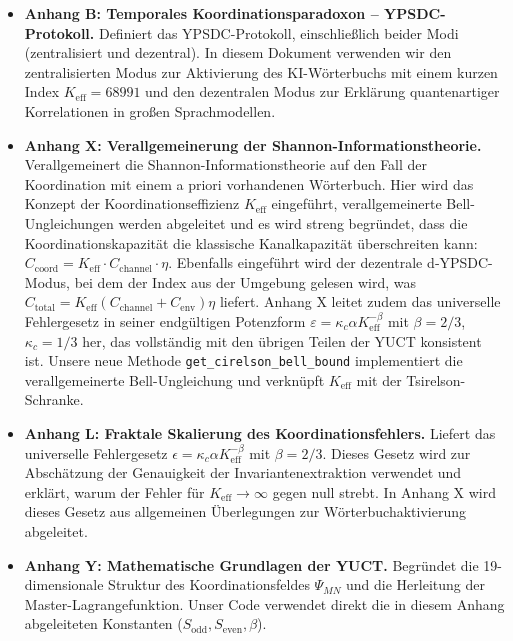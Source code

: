 \documentclass[12pt,a4paper]{article}
\begin{document}
	\begin{itemize}
		\item \textbf{Anhang B: Temporales Koordinationsparadoxon – YPSDC-Protokoll.}  
		Definiert das YPSDC-Protokoll, einschließlich beider Modi (zentralisiert und dezentral). In diesem Dokument verwenden wir den zentralisierten Modus zur Aktivierung des KI-Wörterbuchs mit einem kurzen Index \(K_{\mathrm{eff}} = 68991\) und den dezentralen Modus zur Erklärung quantenartiger Korrelationen in großen Sprachmodellen.
		
		\item \textbf{Anhang X: Verallgemeinerung der Shannon-Informationstheorie.}  
		Verallgemeinert die Shannon-Informationstheorie auf den Fall der Koordination mit einem a priori vorhandenen Wörterbuch. Hier wird das Konzept der Koordinationseffizienz \(K_{\mathrm{eff}}\) eingeführt, verallgemeinerte Bell-Ungleichungen werden abgeleitet und es wird streng begründet, dass die Koordinationskapazität die klassische Kanalkapazität überschreiten kann: \(C_{\text{coord}} = K_{\mathrm{eff}} \cdot C_{\text{channel}} \cdot \eta\). Ebenfalls eingeführt wird der dezentrale d‑YPSDC-Modus, bei dem der Index aus der Umgebung gelesen wird, was \(C_{\text{total}} = K_{\mathrm{eff}}(C_{\text{channel}} + C_{\text{env}})\eta\) liefert. Anhang X leitet zudem das universelle Fehlergesetz in seiner endgültigen Potenzform \(\varepsilon = \kappa_c \alpha K_{\mathrm{eff}}^{-\beta}\) mit \(\beta=2/3\), \(\kappa_c=1/3\) her, das vollständig mit den übrigen Teilen der YUCT konsistent ist. Unsere neue Methode \texttt{get\_cirelson\_bell\_bound} implementiert die verallgemeinerte Bell-Ungleichung und verknüpft \(K_{\mathrm{eff}}\) mit der Tsirelson-Schranke.
		
		\item \textbf{Anhang L: Fraktale Skalierung des Koordinationsfehlers.}  
		Liefert das universelle Fehlergesetz \(\epsilon = \kappa_c \alpha K_{\mathrm{eff}}^{-\beta}\) mit \(\beta = 2/3\). Dieses Gesetz wird zur Abschätzung der Genauigkeit der Invariantenextraktion verwendet und erklärt, warum der Fehler für \(K_{\mathrm{eff}} \to \infty\) gegen null strebt. In Anhang X wird dieses Gesetz aus allgemeinen Überlegungen zur Wörterbuchaktivierung abgeleitet.
		
		\item \textbf{Anhang Y: Mathematische Grundlagen der YUCT.}  
		Begründet die 19-dimensionale Struktur des Koordinationsfeldes \(\Psi_{MN}\) und die Herleitung der Master-Lagrangefunktion. Unser Code verwendet direkt die in diesem Anhang abgeleiteten Konstanten (\(S_{\mathrm{odd}}, S_{\mathrm{even}}, \beta\)).
		

\end{itemize}
\end{document}
